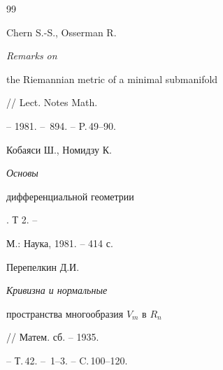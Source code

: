 \begin{thebibliography}{99}





 Chern S.-S., Osserman R. {\em Remarks on


the Riemannian metric of a minimal submanifold} // Lect. Notes Math.


-- 1981. -- \No\,894. -- P.\,49--90.





 Кобаяси Ш., Номидзу К. {\em Основы


дифференциальной геометрии}. Т 2. -- 


М.: Наука, 1981. -- 414 с.





 Перепелкин Д.И. {\em Кривизна и нормальные


пространства многообразия $V_m$ в $R_n$} // Матем. сб. -- 1935.


-- Т.\,42. -- \No\,1--3. -- C.\,100--120.





\end{thebibliography} 


 


\vskip 2cm 


 






 


 


